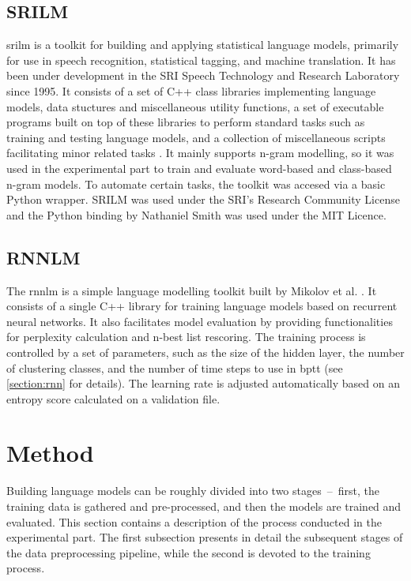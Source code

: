 \subsection{SRILM}
\gls{srilm} is a toolkit for building and applying statistical language models, primarily for use in speech recognition, statistical tagging, and machine translation. It has been under development in the SRI Speech Technology and Research Laboratory since 1995. It consists of a set of C++ class libraries implementing language models, data stuctures and miscellaneous utility functions, a set of executable programs built on top of these libraries to perform standard tasks such as training and testing language models, and a collection of miscellaneous scripts facilitating minor related tasks \cite{stolcke2011srilm}. It mainly supports n-gram modelling, so it was used in the experimental part to train and evaluate word-based and class-based n-gram models. To automate certain tasks, the toolkit was accesed via a basic Python wrapper. SRILM was used under the SRI's Research Community License and the Python binding by Nathaniel Smith was used under the MIT Licence.
\subsection{RNNLM}
The \gls{rnnlm} is a simple language modelling toolkit built by Mikolov et al. \cite{mikolov2011extensions}. It consists of a single C++ library for training language models based on recurrent neural networks. It also facilitates model evaluation by providing functionalities for perplexity calculation and n-best list rescoring. The training process is controlled by a set of parameters, such as the size of the hidden layer, the number of clustering classes, and the number of time steps to use in \gls{bptt} (see \ref{section:rnn} for details). The learning rate is adjusted automatically based on an entropy score calculated on a validation file.
\section{Method}
\label{section:method}
Building language models can be roughly divided into two stages~--~first, the training data is gathered and pre-processed, and then the models are trained and evaluated. This section contains a description of the process conducted in the experimental part. The first subsection presents in detail the subsequent stages of the data preprocessing pipeline, while the second is devoted to the training process.
